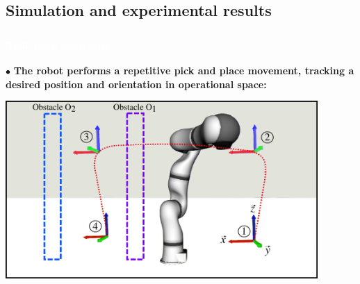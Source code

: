 %      





\subsection{Simulation and experimental results}
\begin{frame}
\frametitle{{\textcolor{white}{\hspace{0.2cm}Test case scenario}}}
$\bullet$ \textbf{The robot performs a repetitive pick
and place movement, tracking a \\
\hspace{3mm}desired position and orientation in operational space:} 
\vspace{5mm}
\begin{center}
\includegraphics[width=0.89\textwidth]{videos/kuka_in_xde862301.pdf}
\end{center}
      
\end{frame}


